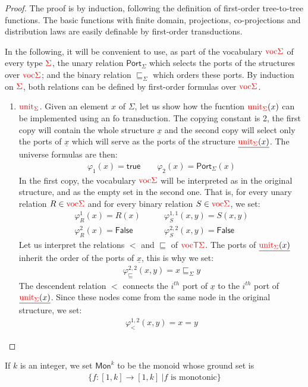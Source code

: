     \begin{proof}
    The proof is by induction, following the definition of first-order tree-to-tree functions. The basic functions with finite domain, projections, co-projections and distribution laws are easily definable by first-order transductions.  
    
    In the following, it will be convenient to use, as part of the vocabulary ${\color{red}{\mathrm{voc}}}{\color{red}{\Sigma}}$ of every type ${\color{red}{\Sigma}}$, the unary relation  $\mathsf{Port}_\Sigma$ which selects the ports of the structures over ${\color{red}{\mathrm{voc}}}{\color{red}{\Sigma}}$; and the binary relation $\sqsubseteq_\Sigma$ which orders these ports. By induction on ${\color{red}{\Sigma}}$, both relations can be defined by first-order formulas over  ${\color{red}{\mathrm{voc}}}{\color{red}{\Sigma}}$.
    
    \begin{enumerate}
    \item ${\color{red}{\mathrm{unit}}}_{\color{red}{\Sigma}}$. Given an element $x$ of $\Sigma$, let us show how the fucntion ${\color{red}{\mathrm{unit}}}_{\color{red}{\Sigma}}(x)$ can be implemented using an fo transduction.  The copying constant is 2,
    the first copy will contain the whole structure $\underline{x}$ and the second copy will select only the ports of $\underline{x}$ which will serve as the ports of the structure $\underline{{\color{red}{\mathrm{unit}}}_{\color{red}{\Sigma}}(x)}$.  The universe formulas are then:
    \begin{align*}
    \varphi_1(x)=\mathsf{true} \qquad \varphi_2(x)=\mathsf{Port}_\Sigma(x)
    \end{align*}
    In the first copy, the vocabulary ${\color{red}{\mathrm{voc}}}{\color{red}{\Sigma}}$ will be interpreted as in the original structure, and as the empty set in the second one. That is, for every unary relation $R\in {\color{red}{\mathrm{voc}}}{\color{red}{\Sigma}}$ and for every binary relation $S \in {\color{red}{\mathrm{voc}}}{\color{red}{\Sigma}}$, we set:
    \begin{align*}
   \varphi_R^{1}(x)=R(x) \quad&\quad \varphi_S^{1,1}(x,y)=S(x,y)\\
   \varphi_R^{2}(x)=\mathsf{False} \quad&\quad \varphi_S^{2,2}(x,y)=\mathsf{False}
\end{align*}      
Let us interpret the relations $<$ and $\sqsubseteq$ of ${\color{red}{\mathrm{voc}}}{\color{red}{\mathsf T}}{\color{red}{\Sigma}}$. The  ports of $\underline{{\color{red}{\mathrm{unit}}}_{\color{red}{\Sigma}}(x)}$ inherit the order of the ports of $\underline{x}$, this is why we set:
\begin{align*}
\varphi_\sqsubseteq^{2,2}(x,y)=x\sqsubseteq_\Sigma y
\end{align*}
The descendent relation $<$ connects the $i^{th}$ port of $\underline{x}$ to the $i^{th}$ port of $\underline{{\color{red}{\mathrm{unit}}}_{\color{red}{\Sigma}}(x)}$. Since these nodes come from the same node in the original structure, we set:
\begin{align*}
\varphi_<^{1,2}(x,y)=x=y
\end{align*}
    \end{enumerate}
    
       \end{proof}
   If $k$ is an integer, we set $\mathsf{Mon}^k$ to be the monoid whose ground set is 
   \begin{align*}
   \{f:[1,k]\to [1,k] \ | f \text{ is monotonic}\}
\end{align*}    

